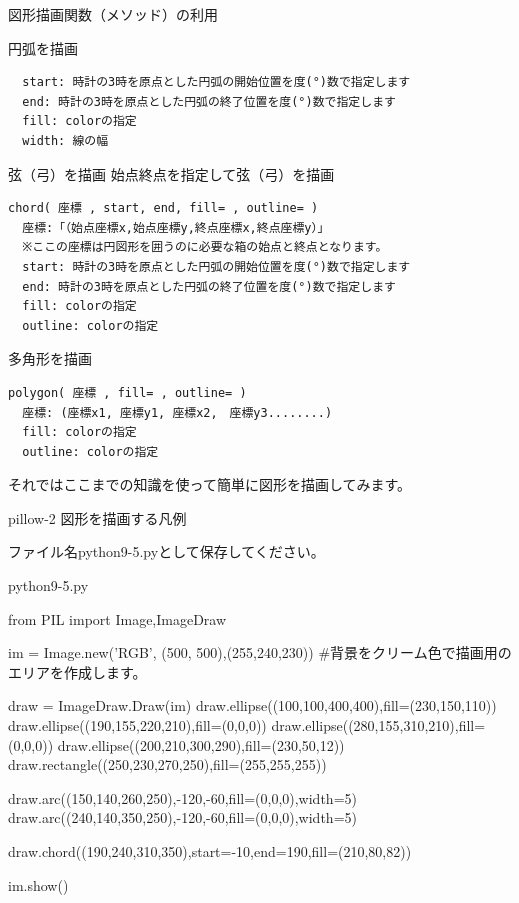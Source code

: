 \documentclass[11pt,a4paper,dvipdfmx,titlepage]{jsreport}
\begin{document}
\begin{grabox}{図形描画関数（メソッド）の利用}
\begin{codebox}{円弧を描画}
\begin{verbatim}
  start: 時計の3時を原点とした円弧の開始位置を度(°)数で指定します
  end: 時計の3時を原点とした円弧の終了位置を度(°)数で指定します
  fill: colorの指定
  width: 線の幅
\end{verbatim}
\end{codebox}
\begin{codebox}{弦（弓）を描画}
始点終点を指定して弦（弓）を描画
\begin{verbatim}
chord( 座標 , start, end, fill= , outline= )
  座標:「（始点座標x,始点座標y,終点座標x,終点座標y）」
  ※ここの座標は円図形を囲うのに必要な箱の始点と終点となります。
  start: 時計の3時を原点とした円弧の開始位置を度(°)数で指定します
  end: 時計の3時を原点とした円弧の終了位置を度(°)数で指定します
  fill: colorの指定
  outline: colorの指定
\end{verbatim}
\end{codebox}
\begin{codebox}{多角形を描画}
\begin{verbatim}
polygon( 座標 , fill= , outline= )
  座標: (座標x1, 座標y1, 座標x2,　座標y3........)
  fill: colorの指定
  outline: colorの指定
\end{verbatim}
\end{codebox}
\end{grabox}

\newpage

それではここまでの知識を使って簡単に図形を描画してみます。

\begin{pabox}{pillow-2}
図形を描画する凡例

ファイル名python9-5.pyとして保存してください。
\begin{codebox}{python9-5.py}
\begin{listing}{1}
from PIL import Image,ImageDraw

im = Image.new('RGB', (500, 500),(255,240,230))
#背景をクリーム色で描画用のエリアを作成します。

draw = ImageDraw.Draw(im)
draw.ellipse((100,100,400,400),fill=(230,150,110))
draw.ellipse((190,155,220,210),fill=(0,0,0))
draw.ellipse((280,155,310,210),fill=(0,0,0))
draw.ellipse((200,210,300,290),fill=(230,50,12))
draw.rectangle((250,230,270,250),fill=(255,255,255))

draw.arc((150,140,260,250),-120,-60,fill=(0,0,0),width=5)
draw.arc((240,140,350,250),-120,-60,fill=(0,0,0),width=5)

draw.chord((190,240,310,350),start=-10,end=190,fill=(210,80,82))

im.show()

\end{listing}
\end{codebox}
\end{pabox}
\end{document}
